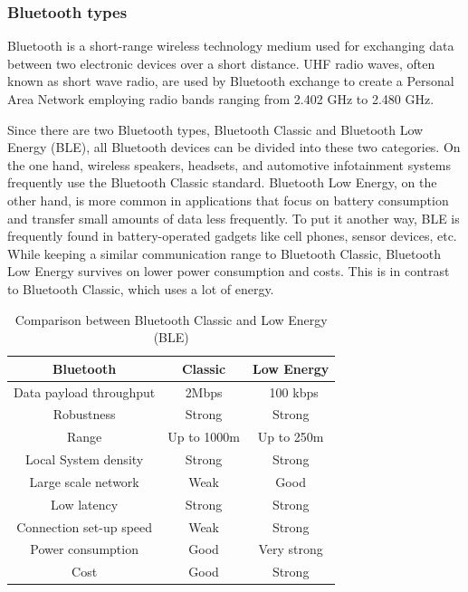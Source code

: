 \subsubsection{Bluetooth types}
Bluetooth is a short-range wireless technology medium used for exchanging data between two electronic devices over a short distance. 
UHF radio waves, often known as short wave radio, are used by Bluetooth exchange to create a Personal Area Network employing radio bands ranging from 2.402 GHz to 2.480 GHz.

Since there are two Bluetooth types, Bluetooth Classic and Bluetooth Low Energy (BLE), all Bluetooth devices can be divided into these two categories. On the one hand, wireless speakers, headsets, and automotive infotainment systems frequently use the Bluetooth Classic standard. Bluetooth Low Energy, on the other hand, is more common in applications that focus on battery consumption and transfer small amounts of data less frequently. To put it another way, BLE is frequently found in battery-operated gadgets like cell phones, sensor devices, etc. While keeping a similar communication range to Bluetooth Classic, Bluetooth Low Energy survives on lower power consumption and costs. This is in contrast to Bluetooth Classic, which uses a lot of energy.

\begin{table}[htbp]
    \centering
    \begin{tabular}{|c|c|c|}
        \hline
        \textbf{Bluetooth} & \textbf{Classic} & \textbf{Low Energy}  \\
        \hline
        Data payload throughput & 2Mbps & ~100 kbps\\
        \hline
        Robustness & Strong & Strong\\
        \hline
        Range & Up to 1000m & Up to 250m\\
        \hline
        Local System density & Strong & Strong\\
        \hline
        Large scale network & Weak & Good\\
        \hline
        Low latency & Strong & Strong\\
        \hline
        Connection set-up speed & Weak & Strong\\
        \hline
        Power consumption & Good & Very strong\\
        \hline
        Cost & Good & Strong \\
        \hline
        \end{tabular}
    \caption{Comparison between Bluetooth Classic and Low Energy (BLE) \cite{b4}}
    \label{tab:my_label}
\end{table}


